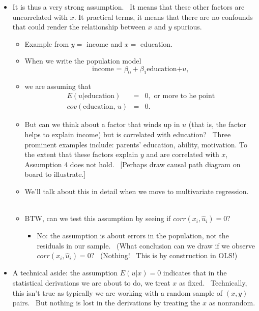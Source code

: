 \documentclass[11pt]{article}
\begin{document}
\begin{itemize}
\begin{itemize}
\item It is thus a very strong assumption. \ It means that these other
factors are uncorrelated with $x$. It practical terms, it means that there
are no confounds that could render the relationship between $x$ and $y$
spurious.

\begin{itemize}
\item Example from $y=$ income and $x=$ education.

\item When we write the population model%
\begin{equation*}
\text{income = }\beta _{0}+\beta _{1}\text{education+}u,
\end{equation*}

\item we are assuming that 
\begin{eqnarray*}
E(u|\text{education}) &=&0,\text{ or more to he point} \\
cov\left( \text{education, }u\right) &=&0.
\end{eqnarray*}

\item But can we think about a factor that winds up in $u$ (that is, the
factor helps to explain income) but is correlated with education? \ Three
prominent examples include: parents' education, ability, motivation. To the
extent that these factors explain $y$ and are correlated with $x$,
Assumption 4 does not hold. \ [Perhaps draw causal path diagram on board to
illustrate.]

\item We'll talk about this in detail when we move to multivariate
regression. \ \ 

\item BTW, can we test this assumption by seeing if $corr(x_{i},\widehat{u}%
_{i})=0?$ \ 

\begin{itemize}
\item No: the assumption is about errors in the population, not the
residuals in our sample. \ (What conclusion can we draw if we observe $%
corr(x_{i},\widehat{u}_{i})=0?$ \ (Nothing! \ This is by construction in
OLS!)
\end{itemize}
\end{itemize}

\item A technical aside: the assumption $E(u|x)=0$ indicates that in the
statistical derivations we are about to do, we treat $x$ as fixed. \
Technically, this isn't true as typically we are working with a random
sample of $\left( x,y\right) $ pairs. \ But nothing is lost in the
derivations by treating the $x$ as nonrandom. \ 
\end{itemize}
\end{itemize}
\end{document}
